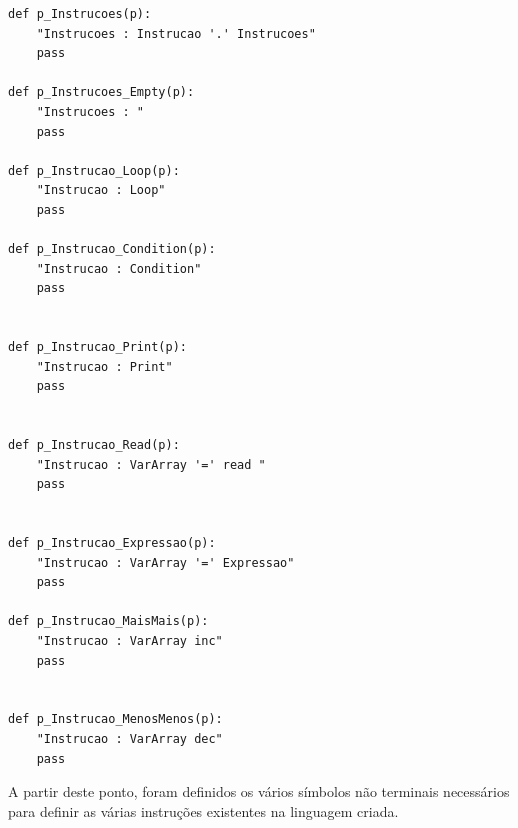 \documentclass[11pt,a4paper]{report}
\begin{document}
\begin{verbatim}
def p_Instrucoes(p):
    "Instrucoes : Instrucao '.' Instrucoes"
    pass

def p_Instrucoes_Empty(p):
    "Instrucoes : "
    pass

def p_Instrucao_Loop(p):
    "Instrucao : Loop"
    pass

def p_Instrucao_Condition(p):
    "Instrucao : Condition"
    pass


def p_Instrucao_Print(p):
    "Instrucao : Print"
    pass
    

def p_Instrucao_Read(p):
    "Instrucao : VarArray '=' read "
    pass
        

def p_Instrucao_Expressao(p):
    "Instrucao : VarArray '=' Expressao"
    pass

def p_Instrucao_MaisMais(p):
    "Instrucao : VarArray inc"
    pass


def p_Instrucao_MenosMenos(p):
    "Instrucao : VarArray dec"
    pass

\end{verbatim}

A partir deste ponto, foram definidos os vários símbolos não terminais necessários para definir as várias instruções existentes na linguagem criada. 
\end{document}
